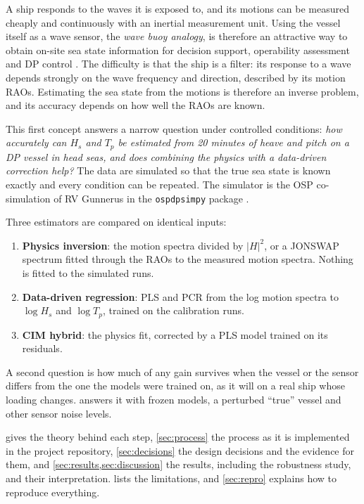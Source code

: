 \documentclass[11pt,a4paper]{article}
\newcommand{\Hs}{H_{s}}
\newcommand{\Tp}{T_{p}}
\begin{document}
A ship responds to the waves it is exposed to, and its motions can be measured cheaply and
continuously with an inertial measurement unit. Using the vessel itself as a wave sensor,
the \emph{wave buoy analogy}, is therefore an attractive way to obtain on-site sea state
information for decision support, operability assessment and DP
control \citep{nielsen2006,nielsen2017,tannuri2003,brodtkorb2018}. The difficulty is that the
ship is a filter: its response to a wave depends strongly on the wave frequency and direction,
described by its motion RAOs. Estimating the sea state from the motions is therefore an
inverse problem, and its accuracy depends on how well the RAOs are known.

This first concept answers a narrow question under controlled conditions: \emph{how accurately
can $\Hs$ and $\Tp$ be estimated from 20 minutes of heave and pitch on a DP vessel in head seas,
and does combining the physics with a data-driven correction help?} The data are simulated so
that the true sea state is known exactly and every condition can be repeated. The simulator
is the OSP co-simulation of RV Gunnerus in the \texttt{ospdpsimpy} package \citep{ospdpsimpy}.

Three estimators are compared on identical inputs:
\begin{enumerate}
  \item \textbf{Physics inversion}: the motion spectra divided by $|H|^2$, or a JONSWAP
        spectrum fitted through the RAOs to the measured motion spectra. Nothing is fitted to
        the simulated runs.
  \item \textbf{Data-driven regression}: PLS and PCR from the log motion spectra to
        $\log \Hs$ and $\log \Tp$, trained on the calibration runs.
  \item \textbf{CIM hybrid}: the physics fit, corrected by a PLS model trained on its residuals.
\end{enumerate}
A second question is how much of any gain survives when the vessel or the sensor differs from
the one the models were trained on, as it will on a real ship whose loading changes.
 answers it with frozen models, a perturbed ``true'' vessel and other
sensor noise levels.

 gives the theory behind each step, \cref{sec:process} the process as it is
implemented in the project repository, \cref{sec:decisions} the design decisions and the evidence
for them, and \cref{sec:results,sec:discussion} the results, including the robustness study, and
their interpretation.
 lists the limitations, and \cref{sec:repro} explains how to reproduce
everything.
\end{document}
